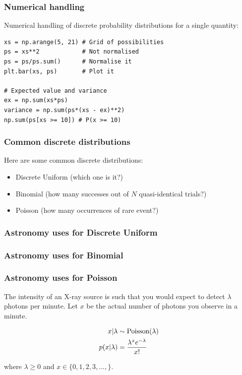 \documentclass{beamer}
\begin{document}
\begin{frame}[t, fragile]
\frametitle{Numerical handling}
Numerical handling of discrete probability distributions for a single
quantity: \vspace{2em}

\begin{verbatim}
xs = np.arange(5, 21) # Grid of possibilities
ps = xs**2            # Not normalised
ps = ps/ps.sum()      # Normalise it
plt.bar(xs, ps)       # Plot it

# Expected value and variance
ex = np.sum(xs*ps) 
variance = np.sum(ps*(xs - ex)**2)
np.sum(ps[xs >= 10]) # P(x >= 10)
\end{verbatim}


\end{frame}




\begin{frame}[t, fragile]
\frametitle{Common discrete distributions}

Here are some common discrete distributions:

\begin{itemize}
\item <2-> Discrete Uniform (which one is it?)
\item <3-> Binomial (how many successes out of $N$ quasi-identical trials?)
\item <4-> Poisson (how many occurrences of rare event?)
\end{itemize}

\end{frame}


\begin{frame}[t, fragile]
\frametitle{Astronomy uses for Discrete Uniform}



\end{frame}


\begin{frame}[t, fragile]
\frametitle{Astronomy uses for Binomial}


\end{frame}



\begin{frame}[t, fragile]
\frametitle{Astronomy uses for Poisson}


The intensity of an X-ray source is such that you would expect to detect
$\lambda$ photons per minute. Let $x$ be the actual number of photons you
observe in a minute.

\begin{align}
x | \lambda &\sim \textnormal{Poisson}(\lambda) \\
p(x | \lambda) &= \frac{\lambda^x e^{-\lambda}}{x!}
\end{align}

where $\lambda \geq 0$ and $x \in \{0, 1, 2, 3, ..., \}$.


\end{frame}
\end{document}
